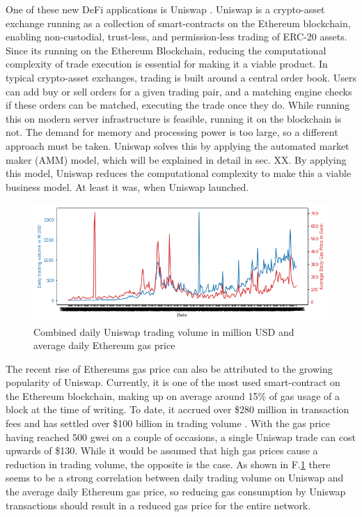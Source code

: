 \documentclass[../../thesis.tex]{subfiles}
\begin{document}
One of these new DeFi applications is Uniswap \cite{adams2020uniswap}. Uniswap is a crypto-asset exchange running as a collection of smart-contracts on the Ethereum blockchain, enabling non-custodial, trust-less, and permission-less trading of ERC-20 assets. Since its running on the Ethereum Blockchain, reducing the computational complexity of trade execution is essential for making it a viable product. In typical crypto-asset exchanges, trading is built around a central order book. Users can add buy or sell orders for a given trading pair, and a matching engine checks if these orders can be matched, executing the trade once they do. While running this on modern server infrastructure is feasible, running it on the blockchain is not. The demand for memory and processing power is too large, so a different approach must be taken. Uniswap solves this by applying the automated market maker (AMM) model, which will be explained in detail in sec. XX. By applying this model, Uniswap reduces the computational complexity to make this a viable business model. At least it was, when Uniswap launched. 

\begin{figure}[h]
    \centerline{\includegraphics[totalheight=5.6cm]{diagrams/gas_volume.png}}
    \caption{Combined daily Uniswap trading volume in million USD and average daily Ethereum gas price}
    \label{fig:gas_vol}
\end{figure}

The recent rise of Ethereums gas price \cite{gasprice} can also be attributed to the growing popularity of Uniswap. Currently, it is one of the most used smart-contract on the Ethereum blockchain, making up on average around 15\% of gas \cite{eth_gas_guzzlers} usage of a block at the time of writing. To date, it accrued over \$280 million in transaction fees \cite{uniswap_tx_fees} and has settled over \$100 billion in trading volume \cite{cummulative_vol}. With the gas price having reached 500 gwei on a couple of occasions, a single Uniswap trade can cost upwards of \$130. While it would be assumed that high gas prices cause a reduction in trading volume, the opposite is the case. As shown in F.\ref{fig:gas_vol} there seems to be a strong correlation between daily trading volume on Uniswap and the average daily Ethereum gas price, so reducing gas consumption by Uniswap transactions should result in a reduced gas price for the entire network.
\end{document}

